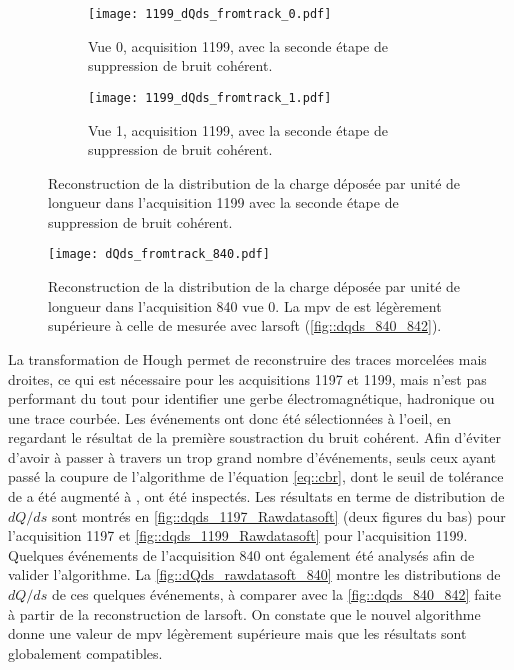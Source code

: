       \begin{figure}[htbp]
        \centering
        \begin{subfigure}[t]{0.48\textwidth}
          \centering
          \texttt{[image: 1199\_dQds\_fromtrack\_0.pdf]}
          \caption{Vue 0, acquisition 1199, avec la seconde étape de suppression de bruit cohérent.}
        \end{subfigure}\hfill
        \begin{subfigure}[t]{0.48\textwidth}
          \centering
          \texttt{[image: 1199\_dQds\_fromtrack\_1.pdf]}
          \caption{Vue 1, acquisition 1199, avec la seconde étape de suppression de bruit cohérent.}
        \end{subfigure}
        \caption[Reconstruction de la charge déposée par unité de longueur dans l'acquisition 1199]{\label{fig::dqds_1199_Rawdatasoft}Reconstruction de la distribution de la charge déposée par unité de longueur dans l'acquisition 1199 avec la seconde étape de suppression de bruit cohérent.}
      \end{figure}

      \begin{figure}[htbp]      
        \centering
        \texttt{[image: dQds\_fromtrack\_840.pdf]}
        \caption[Test de l'algorithme sur l'acquisition 840]{\label{fig::dQds_rawdatasoft_840}Reconstruction de la distribution de la charge déposée par unité de longueur dans l'acquisition 840 vue 0. La \gls{mpv} de  est légèrement supérieure à celle de  mesurée avec \gls{larsoft} (\autoref{fig::dqds_840_842}).}
      \end{figure}

      La transformation de Hough permet de reconstruire des traces morcelées mais droites, ce qui est nécessaire pour les acquisitions 1197 et 1199, mais n'est pas performant du tout pour identifier une gerbe électromagnétique, hadronique ou une trace courbée. Les événements ont donc été sélectionnées à l'oeil, en regardant le résultat de la première soustraction du bruit cohérent. Afin d'éviter d'avoir à passer à travers un trop grand nombre d'événements, seuls ceux ayant passé la coupure de l'algorithme de l'équation \eqref{eq::cbr}, dont le seuil de tolérance de  a été augmenté à , ont été inspectés. Les résultats en terme de distribution de $dQ/ds$ sont montrés en \autoref{fig::dqds_1197_Rawdatasoft} (deux figures du bas) pour l'acquisition 1197 et \autoref{fig::dqds_1199_Rawdatasoft} pour l'acquisition 1199. Quelques événements de l'acquisition 840 ont également été analysés afin de valider l'algorithme. La \autoref{fig::dQds_rawdatasoft_840} montre les distributions de $dQ/ds$ de ces quelques événements, à comparer avec la \autoref{fig::dqds_840_842} faite à partir de la reconstruction de \gls{larsoft}. On constate que le nouvel algorithme donne une valeur de \gls{mpv} légèrement supérieure mais que les résultats sont globalement compatibles. 

